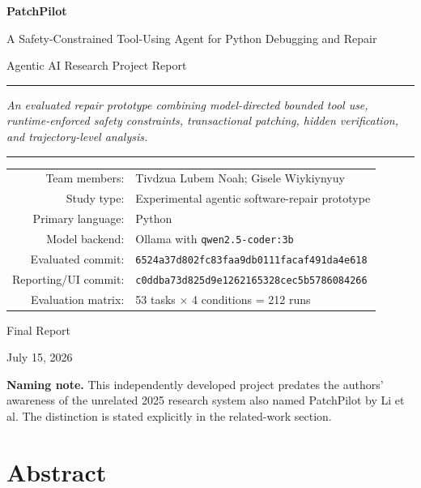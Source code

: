 \documentclass[11pt,a4paper]{article}
\newcommand{\code}[1]{\texttt{#1}}
\begin{document}

\begin{titlepage}
\centering
\vspace*{0.8cm}
{\Huge\bfseries PatchPilot\par}
\vspace{0.35cm}
{\LARGE A Safety-Constrained Tool-Using Agent for Python Debugging and Repair\par}
\vspace{0.8cm}
{\large Agentic AI Research Project Report\par}
\vspace{0.9cm}
\rule{0.82\textwidth}{0.5pt}\par
\vspace{0.55cm}
{\large\itshape
An evaluated repair prototype combining model-directed bounded tool use,
runtime-enforced safety constraints, transactional patching, hidden verification,
and trajectory-level analysis.\par}
\vspace{0.55cm}
\rule{0.82\textwidth}{0.5pt}\par
\vfill
\begin{tabular}{rl}
Team members: & Tivdzua Lubem Noah; Gisele Wiykiynyuy \\
Study type: & Experimental agentic software-repair prototype \\
Primary language: & Python \\
Model backend: & Ollama with \code{qwen2.5-coder:3b} \\
Evaluated commit: & \code{6524a37d802fc83faa9db0111facaf491da4e618} \\
Reporting/UI commit: & \code{c0ddba73d825d9e1262165328cec5b5786084266} \\
Evaluation matrix: & 53 tasks $\times$ 4 conditions = 212 runs \\
\end{tabular}
\vfill
{\large Final Report\par}
\vspace{0.2cm}
{\large July 15, 2026\par}
\vspace{0.8cm}
\parbox{0.86\textwidth}{\small
\textbf{Naming note.} This independently developed project predates the authors'
awareness of the unrelated 2025 research system also named PatchPilot by Li et al.
The distinction is stated explicitly in the related-work section.}
\end{titlepage}

\section*{Abstract}
\end{document}
